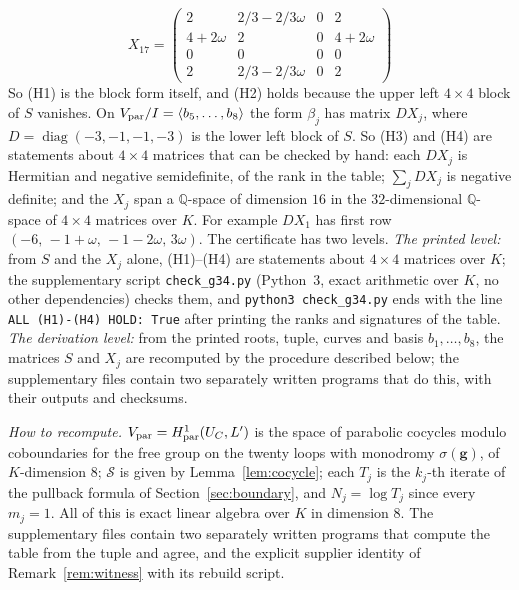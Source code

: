 \documentclass[11pt]{amsart}
\theoremstyle{definition}
\theoremstyle{remark}
\newcommand{\Q}{\mathbb Q}
\newcommand{\Vp}{V_{\rm par}}
\begin{document}
{\[\]
\[
X_{17}=\left(\begin{smallmatrix}2&2/3-2/3\omega&0&2\\4+2\omega&2&0&4+2\omega\\0&0&0&0\\2&2/3-2/3\omega&0&2\end{smallmatrix}\right)
\]
}
So (H1) is the block form itself, and (H2) holds because the upper left $4\times4$ block of $S$ vanishes. On $\Vp/I=\langle b_5,\dots,b_8\rangle$ the form $\beta_j$ has matrix $DX_j$, where $D=\operatorname{diag}(-3,-1,-1,-3)$ is the lower left block of $S$. So (H3) and (H4) are statements about $4\times4$ matrices that can be checked by hand: each $DX_j$ is Hermitian and negative semidefinite, of the rank in the table; $\sum_jDX_j$ is negative definite; and the $X_j$ span a $\Q$-space of dimension $16$ in the $32$-dimensional $\Q$-space of $4\times4$ matrices over $K$. For example $DX_1$ has first row $(-6,\,-1+\omega,\,-1-2\omega,\,3\omega)$. The certificate has two levels. \emph{The printed level:} from $S$ and the $X_j$ alone, (H1)--(H4) are statements about $4\times4$ matrices over $K$; the supplementary script \texttt{check\_g34.py} (Python~3, exact arithmetic over $K$, no other dependencies) checks them, and \texttt{python3 check\_g34.py} ends with the line \texttt{ALL (H1)-(H4) HOLD: True} after printing the ranks and signatures of the table. \emph{The derivation level:} from the printed roots, tuple, curves and basis $b_1,\dots,b_8$, the matrices $S$ and $X_j$ are recomputed by the procedure described below; the supplementary files contain two separately written programs that do this, with their outputs and checksums.

\emph{How to recompute.} $\Vp=H^1_{\rm par}(U_C,L')$ is the space of parabolic cocycles modulo coboundaries for the free group on the twenty loops with monodromy $\sigma(\mathbf g)$, of $K$-dimension $8$; $\mathcal S$ is given by Lemma~\ref{lem:cocycle}; each $T_j$ is the $k_j$-th iterate of the pullback formula of Section~\ref{sec:boundary}, and $N_j=\log T_j$ since every $m_j=1$. All of this is exact linear algebra over $K$ in dimension $8$. The supplementary files contain two separately written programs that compute the table from the tuple and agree, and the explicit supplier identity of Remark~\ref{rem:witness} with its rebuild script.
\end{document}
